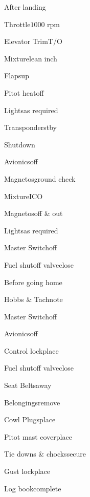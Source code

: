 \begin{multicols}{2}
\begin{checklist}{After landing}
    \item{Throttle}{$1000$ rpm}
    \item{Elevator Trim}{T/O}
    \item{Mixture}{lean  inch}
    \item{Flaps}{up}
    \item{Pitot heat}{off}
    \item{Lights}{as required}
    \item{Transponder}{stby}
\end{checklist}

\begin{checklist}{Shutdown}
    \item{Avionics}{off}
    \item{Magnetos}{ground check}
    \item{Mixture}{ICO}
    \item{Magnetos}{off \& out}
    \item{Lights}{as required}
    \item{Master Switch}{off}
    \item{Fuel shutoff valve}{close}
\end{checklist}

\begin{checklist}{Before going home}
    \item{Hobbs \& Tach}{note}
    \item{Master Switch}{off}
    \item{Avionics}{off}
    \item{Control lock}{place}
    \item{Fuel shutoff valve}{close}
    \item{Seat Belts}{away}
    \item{Belongings}{remove}
    \item{Cowl Plugs}{place}
    \item{Pitot mast cover}{place}
    \item{Tie downs \& chocks}{secure}
    \item{Gust lock}{place}
    \item{Log book}{complete}
\end{checklist}
\end{multicols}

